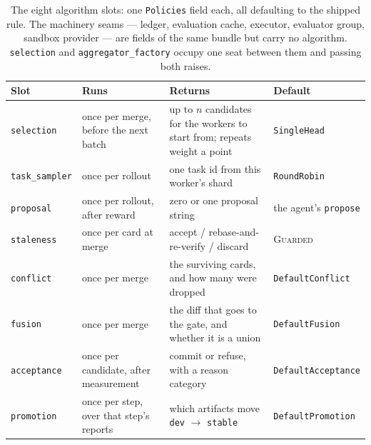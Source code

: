 \documentclass{article}
\newcommand{\code}[1]{\texttt{#1}}
\begin{document}
\begin{table}[t]
\centering
\small
\caption{The eight algorithm slots: one \code{Policies} field each, all defaulting to the shipped rule. The machinery seams --- ledger, evaluation cache, executor, evaluator group, sandbox provider --- are fields of the same bundle but carry no algorithm. \code{selection} and \code{aggregator\_factory} occupy one seat between them and passing both raises.}
\label{tab:slots}
\begin{tabular}{@{}>{\raggedright\arraybackslash}p{2.1cm}>{\raggedright\arraybackslash}p{3.25cm}>{\raggedright\arraybackslash}p{4.9cm}>{\raggedright\arraybackslash}p{3.0cm}@{}}
\toprule
\textbf{Slot} & \textbf{Runs} & \textbf{Returns} & \textbf{Default} \\
\midrule
\code{selection}    & once per merge, before the next batch & up to $n$ candidates for the workers to start from; repeats weight a point & \code{SingleHead} \\
\code{task\_sampler} & once per rollout & one task id from this worker's shard & \code{RoundRobin} \\
\code{proposal}     & once per rollout, after reward & zero or one proposal string & the agent's \code{propose} \\
\code{staleness}    & once per card at merge & accept / rebase-and-re-verify / discard & \textsc{Guarded} \\
\code{conflict}     & once per merge & the surviving cards, and how many were dropped & \code{DefaultConflict} \\
\code{fusion}       & once per merge & the diff that goes to the gate, and whether it is a union & \code{DefaultFusion} \\
\code{acceptance}   & once per candidate, after measurement & commit or refuse, with a reason category & \code{DefaultAcceptance} \\
\code{promotion}    & once per step, over that step's reports & which artifacts move \code{dev} $\to$ \code{stable} & \code{DefaultPromotion} \\
\bottomrule
\end{tabular}
\end{table}
\end{document}
